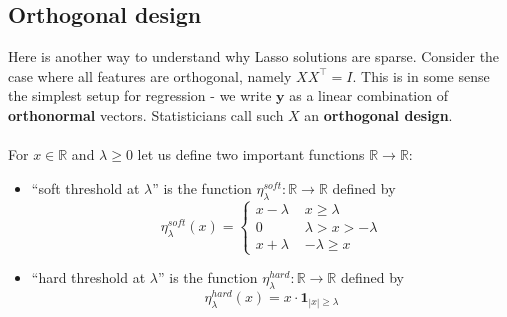 \documentclass[11pt]{article}
\newcommand{\R}{\ensuremath{\mathbb{R}}}
\newcommand{\Tr}{\ensuremath{\top}}
\newcommand{\V}[1]{\mathbf{#1}}
\begin{document}
\subsection{Orthogonal design}

Here is another way to understand why Lasso solutions are sparse.
Consider the case where all features are orthogonal, namely $XX^\Tr=I$. This is
in some sense the simplest setup for regression - we write $\V{y}$ as a linear
combination of {\bf orthonormal} vectors.
Statisticians call such $X$ an {\bf orthogonal design}.
\\~\\
 For $x\in\R$ and $\lambda\geq 0$ let us define two important functions
 $\R\to\R$: 
 \begin{itemize}
        \item ``soft threshold at $\lambda$''
          is the function $\eta^{soft}_\lambda:\R\to\R$ defined by
          \[
            \eta^{soft}_\lambda(x) = 
\begin{cases}
  x-\lambda \,\,& x\geq \lambda \\
  0 \,\,& \lambda > x > -\lambda \\
  x+\lambda \,\,& -\lambda\geq x
\end{cases}
          \]
        \item
          ``hard threshold at $\lambda$'' is the function 
          $ \eta^{hard}_\lambda:\R\to\R$ defined by
          \[
            \eta^{hard}_\lambda(x) = x\cdot \mathbf{1}_{|x|\geq \lambda}
            \]
      \end{itemize}
\end{document}
